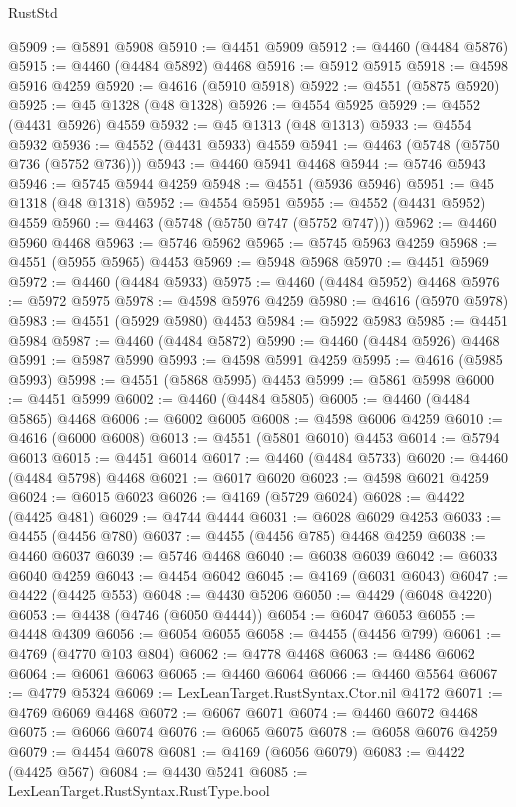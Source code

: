 \begin{lexlean}{RustStd}
\begin{coremodule}
@5909 := @5891 @5908
@5910 := @4451 @5909
@5912 := @4460 (@4484 @5876)
@5915 := @4460 (@4484 @5892) @4468
@5916 := @5912 @5915
@5918 := @4598 @5916 @4259
@5920 := @4616 (@5910 @5918)
@5922 := @4551 (@5875 @5920)
@5925 := @45 @1328 (@48 @1328)
@5926 := @4554 @5925
@5929 := @4552 (@4431 @5926) @4559
@5932 := @45 @1313 (@48 @1313)
@5933 := @4554 @5932
@5936 := @4552 (@4431 @5933) @4559
@5941 := @4463 (@5748 (@5750 @736 (@5752 @736)))
@5943 := @4460 @5941 @4468
@5944 := @5746 @5943
@5946 := @5745 @5944 @4259
@5948 := @4551 (@5936 @5946)
@5951 := @45 @1318 (@48 @1318)
@5952 := @4554 @5951
@5955 := @4552 (@4431 @5952) @4559
@5960 := @4463 (@5748 (@5750 @747 (@5752 @747)))
@5962 := @4460 @5960 @4468
@5963 := @5746 @5962
@5965 := @5745 @5963 @4259
@5968 := @4551 (@5955 @5965) @4453
@5969 := @5948 @5968
@5970 := @4451 @5969
@5972 := @4460 (@4484 @5933)
@5975 := @4460 (@4484 @5952) @4468
@5976 := @5972 @5975
@5978 := @4598 @5976 @4259
@5980 := @4616 (@5970 @5978)
@5983 := @4551 (@5929 @5980) @4453
@5984 := @5922 @5983
@5985 := @4451 @5984
@5987 := @4460 (@4484 @5872)
@5990 := @4460 (@4484 @5926) @4468
@5991 := @5987 @5990
@5993 := @4598 @5991 @4259
@5995 := @4616 (@5985 @5993)
@5998 := @4551 (@5868 @5995) @4453
@5999 := @5861 @5998
@6000 := @4451 @5999
@6002 := @4460 (@4484 @5805)
@6005 := @4460 (@4484 @5865) @4468
@6006 := @6002 @6005
@6008 := @4598 @6006 @4259
@6010 := @4616 (@6000 @6008)
@6013 := @4551 (@5801 @6010) @4453
@6014 := @5794 @6013
@6015 := @4451 @6014
@6017 := @4460 (@4484 @5733)
@6020 := @4460 (@4484 @5798) @4468
@6021 := @6017 @6020
@6023 := @4598 @6021 @4259
@6024 := @6015 @6023
@6026 := @4169 (@5729 @6024)
@6028 := @4422 (@4425 @481)
@6029 := @4744 @4444
@6031 := @6028 @6029 @4253
@6033 := @4455 (@4456 @780)
@6037 := @4455 (@4456 @785) @4468 @4259
@6038 := @4460 @6037
@6039 := @5746 @4468
@6040 := @6038 @6039
@6042 := @6033 @6040 @4259
@6043 := @4454 @6042
@6045 := @4169 (@6031 @6043)
@6047 := @4422 (@4425 @553)
@6048 := @4430 @5206
@6050 := @4429 (@6048 @4220)
@6053 := @4438 (@4746 (@6050 @4444))
@6054 := @6047 @6053
@6055 := @4448 @4309
@6056 := @6054 @6055
@6058 := @4455 (@4456 @799)
@6061 := @4769 (@4770 @103 @804)
@6062 := @4778 @4468
@6063 := @4486 @6062
@6064 := @6061 @6063
@6065 := @4460 @6064
@6066 := @4460 @5564
@6067 := @4779 @5324
@6069 := LexLeanTarget.RustSyntax.Ctor.nil @4172
@6071 := @4769 @6069 @4468
@6072 := @6067 @6071
@6074 := @4460 @6072 @4468
@6075 := @6066 @6074
@6076 := @6065 @6075
@6078 := @6058 @6076 @4259
@6079 := @4454 @6078
@6081 := @4169 (@6056 @6079)
@6083 := @4422 (@4425 @567)
@6084 := @4430 @5241
@6085 := LexLeanTarget.RustSyntax.RustType.bool

\end{coremodule}
\end{lexlean}
